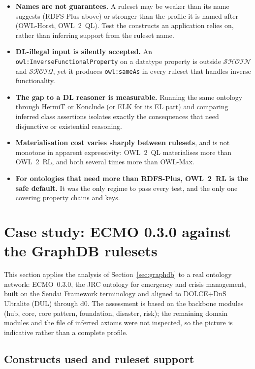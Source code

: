 \documentclass[11pt,a4paper]{article}
\newcommand{\dl}[1]{\ensuremath{\mathcal{#1}}}
\newcommand{\SROIQ}{\dl{SROIQ}}
\newcommand{\SHOIN}{\dl{SHOIN}}
\begin{document}
\begin{itemize}
  \item \textbf{Names are not guarantees.} A ruleset may be weaker than its
    name suggests (RDFS-Plus above) or stronger than the profile it is named
    after (OWL-Horst, OWL~2~QL). Test the constructs an application relies on,
    rather than inferring support from the ruleset name.
  \item \textbf{DL-illegal input is silently accepted.} An
    \texttt{owl:InverseFunctionalProperty} on a datatype property is outside
    \SHOIN{} and \SROIQ{}, yet it produces \texttt{owl:sameAs} in every ruleset
    that handles inverse functionality.
  \item \textbf{The gap to a DL reasoner is measurable.} Running the same
    ontology through HermiT or Konclude (or ELK for its EL part) and comparing
    inferred class assertions isolates exactly the consequences that need
    disjunctive or existential reasoning.
  \item \textbf{Materialisation cost varies sharply between rulesets}, and is
    not monotone in apparent expressivity: OWL~2~QL materialises more than
    OWL~2~RL, and both several times more than OWL-Max.
  \item \textbf{For ontologies that need more than RDFS-Plus, OWL~2~RL is the
    safe default.} It was the only regime to pass every test, and the only one
    covering property chains and keys.
\end{itemize}

\section{Case study: ECMO 0.3.0 against the GraphDB rulesets}
\label{sec:ecmo}

This section applies the analysis of Section~\ref{sec:graphdb} to a real
ontology network: ECMO~0.3.0, the JRC ontology for emergency and crisis
management, built on the Sendai Framework terminology and aligned to
DOLCE+DnS Ultralite (DUL) through d0. The assessment is based on the backbone
modules (hub, core, core pattern, foundation, disaster, risk); the remaining
domain modules and the file of inferred axioms were not inspected, so the
picture is indicative rather than a complete profile.

\subsection*{Constructs used and ruleset support}
\end{document}
